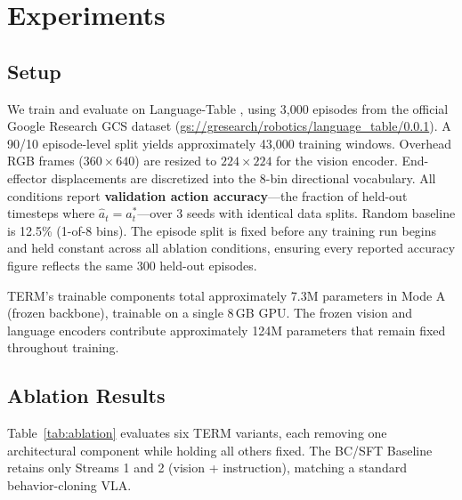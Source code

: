 \documentclass[letterpaper]{article} %
\begin{document}
\section{Experiments}

\subsection{Setup}

We train and evaluate on Language-Table \cite{lynch2023languagetable}, using 3,000 episodes from the official Google Research GCS dataset (\url{gs://gresearch/robotics/language_table/0.0.1}). A 90/10 episode-level split yields approximately 43,000 training windows. Overhead RGB frames ($360{\times}640$) are resized to $224{\times}224$ for the vision encoder. End-effector displacements are discretized into the 8-bin directional vocabulary. All conditions report \textbf{validation action accuracy}---the fraction of held-out timesteps where $\hat{a}_t = a^*_t$---over 3 seeds with identical data splits. Random baseline is 12.5\% (1-of-8 bins). The episode split is fixed before any training run begins and held constant across all ablation conditions, ensuring every reported accuracy figure reflects the same 300 held-out episodes.

TERM's trainable components total approximately 7.3M parameters in Mode A (frozen backbone), trainable on a single 8\,GB GPU. The frozen vision and language encoders contribute approximately 124M parameters that remain fixed throughout training.

\subsection{Ablation Results}

Table~\ref{tab:ablation} evaluates six TERM variants, each removing one architectural component while holding all others fixed. The BC/SFT Baseline retains only Streams 1 and 2 (vision + instruction), matching a standard behavior-cloning VLA.
\end{document}
